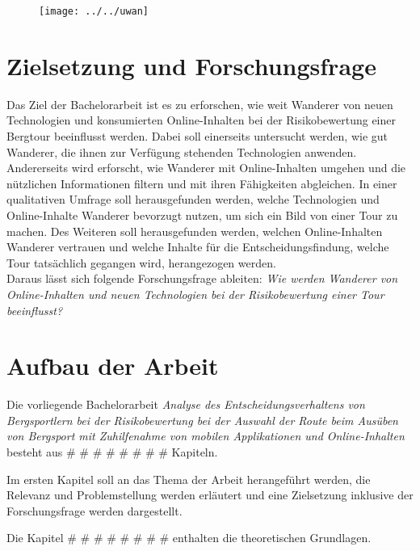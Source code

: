 \begin{figure}
	\centering
	\texttt{[image: ../../uwan]}
	\caption{}
	\label{fig:uwan}
\end{figure}



\section{Zielsetzung und Forschungsfrage}


Das Ziel der Bachelorarbeit ist es zu erforschen, wie weit  Wanderer von neuen Technologien und konsumierten Online-Inhalten bei der Risikobewertung einer Bergtour beeinflusst werden. Dabei soll einerseits untersucht werden, wie gut Wanderer, die ihnen zur Verfügung stehenden Technologien anwenden. Andererseits wird erforscht, wie Wanderer mit Online-Inhalten umgehen und die nützlichen Informationen filtern und mit ihren Fähigkeiten abgleichen. In einer qualitativen Umfrage soll herausgefunden werden, welche Technologien und Online-Inhalte Wanderer bevorzugt nutzen, um sich ein Bild von einer Tour zu machen. Des Weiteren soll herausgefunden werden, welchen Online-Inhalten Wanderer vertrauen und welche Inhalte für die Entscheidungsfindung, welche Tour tatsächlich gegangen wird, herangezogen werden.\\
Daraus lässt sich folgende Forschungsfrage ableiten: 
\textit{Wie werden Wanderer von Online-Inhalten und neuen Technologien bei der Risikobewertung einer Tour beeinflusst?}

\section{Aufbau der Arbeit}

Die vorliegende Bachelorarbeit \textit{Analyse des Entscheidungsverhaltens von Bergsportlern bei der Risikobewertung bei der Auswahl der Route beim Ausüben von Bergsport mit Zuhilfenahme von mobilen Applikationen und Online-Inhalten} besteht aus \# \# \# \# \# \# \# \# Kapiteln.\par

Im ersten Kapitel soll an das Thema der Arbeit herangeführt werden, die Relevanz und Problemstellung werden erläutert und eine Zielsetzung inklusive der Forschungsfrage werden dargestellt.\par

Die Kapitel \# \# \# \# \# \# \# \# enthalten die theoretischen Grundlagen.\par

